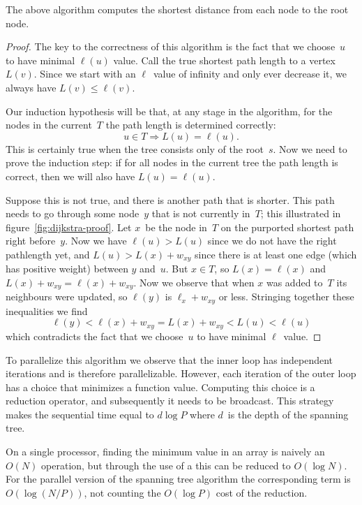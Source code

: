 \begin{theorem}
  The above algorithm computes the shortest distance from each
  node to the root node.
\end{theorem}
\begin{proof}
  The key to the correctness of this algorithm is the fact that
  we choose~$u$ to have minimal $\ell(u)$ value. Call the true shortest path
  length to a vertex~$L(v)$. Since we start with an $\ell$~value of infinity and
  only ever decrease it, we always have $L(v)\leq\ell(v)$.

  Our induction hypothesis will be that, at any stage in the algorithm,
  for the nodes in the current~$T$ the path length is determined correctly:
  \[ u\in T\Rightarrow L(u)=\ell(u). \]
  This is certainly true when the tree consists only of the root~$s$.
  Now we need to prove the induction step: if for all nodes in the
  current tree the path length is correct, then we will also 
  have $L(u)=\ell(u)$. 

  Suppose this is not true, and there is another path that is shorter.
  This path needs to go through some node~$y$ that is not currently in~$T$;
  this illustrated in figure~\ref{fig:dijkstra-proof}.
  Let $x$~be the node in~$T$ on the purported shortest path right before~$y$.
  Now we have $\ell(u)>L(u)$ since we do not have the right pathlength
  yet, and $L(u)>L(x)+w_{xy}$ since there is at least one edge (which has 
  positive weight) between $y$ and~$u$. But $x\in T$, so $L(x)=\ell(x)$
  and $L(x)+w_{xy}=\ell(x)+w_{xy}$. Now we observe that when $x$ was
  added to~$T$ its neighbours were updated, so $\ell(y)$ is $\ell_x+w_{xy}$ or less.
  Stringing together these inequalities we find 
  \[ \ell(y)<\ell(x)+w_{xy}=L(x)+w_{xy}<L(u)<\ell(u) \]
  which contradicts the fact that we choose~$u$ to have minimal $\ell$~value.
\end{proof}

To parallelize this algorithm we observe that the inner loop has
independent iterations and is therefore parallelizable.
However, each iteration of the outer loop
has a choice that minimizes a function value. Computing this
choice is a reduction operator, and subsequently it needs to be broadcast.
This strategy makes the sequential time equal to $d\log P$ where $d$~is
the depth of the spanning tree.

On a single processor, finding the minimum value in an array is
naively an $O(N)$ operation, but through the use of a 
this can be reduced to $O(\log N)$. For the parallel version of the spanning tree
algorithm the corresponding term is~$O(\log (N/P))$, not counting the $O(\log P)$
cost of the reduction.

